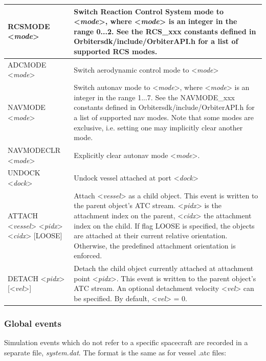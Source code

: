 \documentclass[Orbiter Technical Reference.tex]{subfiles}
\begin{document}
	\begin{longtable}{ |p{}|p{}| }
	\hline\rule{0pt}{2ex}
	RCSMODE <\textit{mode}> & Switch Reaction Control System mode to <\textit{mode}>, where <\textit{mode}> is an integer in the range 0...2. See the RCS\_xxx constants defined in Orbitersdk/include/OrbiterAPI.h for a list of supported RCS modes.\\
	\hline\rule{0pt}{2ex}
	ADCMODE <\textit{mode}> & Switch aerodynamic control mode to <\textit{mode}>\\
	\hline\rule{0pt}{2ex}
	NAVMODE <\textit{mode}> & Switch autonav mode to <\textit{mode}>, where <\textit{mode}> is an integer in the range 1...7. See the NAVMODE\_xxx constants defined in Orbitersdk/include/OrbiterAPI.h for a list of supported nav modes. Note that some modes are exclusive, i.e. setting one may implicitly clear another mode.\\
	\hline\rule{0pt}{2ex}
	NAVMODECLR <\textit{mode}> & Explicitly clear autonav mode <\textit{mode}>.\\
	\hline\rule{0pt}{2ex}
	UNDOCK <\textit{dock}> & Undock vessel attached at port <\textit{dock}>\\
	\hline\rule{0pt}{2ex}
	ATTACH <\textit{vessel}> <\textit{pidx}> <\textit{cidx}> [LOOSE] & Attach <\textit{vessel}> as a child object. This event is written to the parent object's ATC stream. <\textit{pidx}> is the attachment index on the parent, <\textit{cidx}> the attachment index on the child. If flag LOOSE is specified, the objects are attached at their current relative orientation. Otherwise, the predefined attachment orientation is enforced.\\
	\hline\rule{0pt}{2ex}
	DETACH <\textit{pidx}> [<\textit{vel}>] & Detach the child object currently attached at attachment point <\textit{pidx}>. This event is written to the parent object's ATC stream. An optional detachment velocity <\textit{vel}> can be specified. By default, <\textit{vel}> = 0.\\
	\hline
	\end{longtable}


\subsubsection{Global events}
Simulation events which do not refer to a specific spacecraft are recorded in a separate file, \textit{system.dat}. The format is the same as for vessel .atc files:
\end{document}
